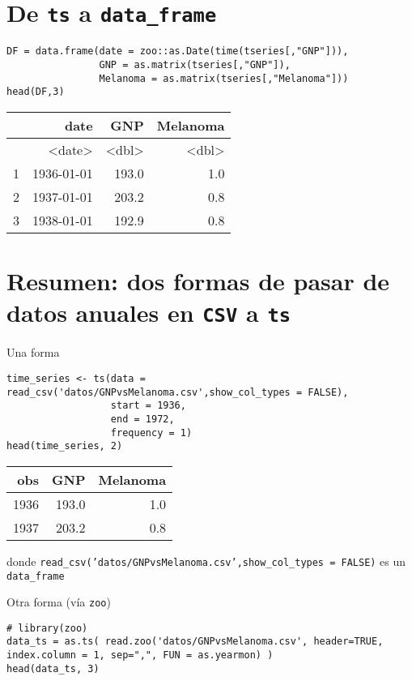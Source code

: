 \documentclass[11pt]{article}
\begin{document}
\section{De \texttt{ts} a \texttt{data\_frame}}
\label{sec:org47f0c9a}

\begin{verbatim}
DF = data.frame(date = zoo::as.Date(time(tseries[,"GNP"])),
                GNP = as.matrix(tseries[,"GNP"]),
                Melanoma = as.matrix(tseries[,"Melanoma"]))
head(DF,3)
\end{verbatim}

\label{}
\begin{center}
\begin{tabular}{rrrr}
 & date & GNP & Melanoma\\
\hline
 & <date> & <dbl> & <dbl>\\
1 & 1936-01-01 & 193.0 & 1.0\\
2 & 1937-01-01 & 203.2 & 0.8\\
3 & 1938-01-01 & 192.9 & 0.8\\
\end{tabular}
\end{center}
\section{Resumen: dos formas de pasar de datos anuales en \texttt{CSV} a \texttt{ts}}
\label{sec:org7884c9a}

Una forma
\begin{verbatim}
time_series <- ts(data = read_csv('datos/GNPvsMelanoma.csv',show_col_types = FALSE),
                  start = 1936,
                  end = 1972,
                  frequency = 1)
head(time_series, 2)
\end{verbatim}

\label{}
\begin{center}
\begin{tabular}{rrr}
obs & GNP & Melanoma\\
\hline
1936 & 193.0 & 1.0\\
1937 & 203.2 & 0.8\\
\end{tabular}
\end{center}

donde \texttt{read\_csv('datos/GNPvsMelanoma.csv',show\_col\_types = FALSE)} es un \texttt{data\_frame}


Otra forma (vía \texttt{zoo})
\begin{verbatim}
# library(zoo)
data_ts = as.ts( read.zoo('datos/GNPvsMelanoma.csv', header=TRUE, index.column = 1, sep=",", FUN = as.yearmon) )
head(data_ts, 3)
\end{verbatim}
\end{document}
